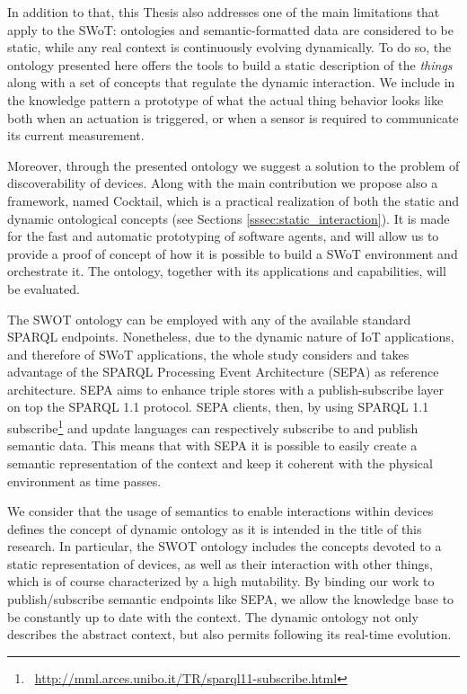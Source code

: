 In addition to that, this Thesis also addresses one of the main limitations that apply to the SWoT: ontologies and semantic-formatted data are considered to be static, while any real context is continuously evolving dynamically. To do so, the ontology presented here offers the tools to build a static description of the \textit{things} along with a set of concepts that regulate the dynamic interaction. We include in the knowledge pattern a prototype of what the actual thing behavior looks like both when an actuation is triggered, or when a sensor is required to communicate its current measurement.

Moreover, through the presented ontology we suggest a solution to the problem of discoverability \cite{guinard2016building} of devices. Along with the main contribution we propose also a framework, named Cocktail, which is a practical realization of both the static and dynamic ontological concepts (see Sections \ref{sssec:static_interaction}). It is made for the fast and automatic prototyping of software agents, and will allow us to provide a proof of concept of how it is possible to build a SWoT environment and orchestrate it. The ontology, together with its applications and capabilities, will be evaluated.

The SWOT ontology can be employed with any of the available standard SPARQL endpoints. Nonetheless, due to the dynamic nature of IoT applications, and therefore of SWoT applications, the whole study considers and takes advantage of the SPARQL Processing Event Architecture (SEPA) \cite{roffia2016semantic,roffia2018dynamic} as reference architecture. SEPA aims to enhance triple stores with a publish-subscribe layer on top the SPARQL 1.1 protocol. SEPA clients, then, by using SPARQL 1.1 subscribe\footnote{\faLink~\url{http://mml.arces.unibo.it/TR/sparql11-subscribe.html}} and update languages can respectively subscribe to and publish semantic data. This means that with SEPA it is possible to easily create a semantic representation of the context and keep it coherent with the physical environment as time passes.

We consider that the usage of semantics to enable interactions within devices defines the concept of dynamic  ontology as it is intended in the title of this research.
In particular, the SWOT ontology includes the concepts devoted to a static representation of devices, as well as their interaction with other things, which is of course characterized by a high mutability. By binding our work to publish/subscribe semantic endpoints like SEPA, we allow the knowledge base to be constantly up to date with the context. The dynamic ontology not only describes the abstract context, but also permits following its real-time evolution.

